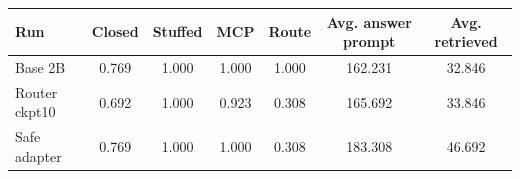 \begin{tabular}{lcccccc}
\toprule
Run & Closed & Stuffed & MCP & Route & Avg. answer prompt & Avg. retrieved \\
\midrule
Base 2B & 0.769 & 1.000 & 1.000 & 1.000 & 162.231 & 32.846 \\
Router ckpt10 & 0.692 & 1.000 & 0.923 & 0.308 & 165.692 & 33.846 \\
Safe adapter & 0.769 & 1.000 & 1.000 & 0.308 & 183.308 & 46.692 \\
\bottomrule
\end{tabular}
